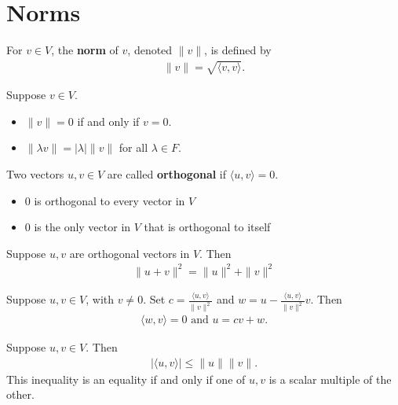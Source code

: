 \documentclass{memoir}
\begin{document}
\section{Norms}
\label{sec:norms}
\begin{defn}[Norm]
	For $v \in V$, the \textbf{norm} of $v$, denoted $\|v\|$, is defined by
	\begin{align*}
		 \|v\| = \sqrt{ \langle v, v \rangle } .
	\end{align*}
\end{defn}
\begin{cor}
	Suppose $v \in V$.
	\begin{itemize}
		\item $\|v\|=0$ if and only if $v = 0$.
		\item $\|\lambda v\|= \left| \lambda \right| \|v\|$ for all $\lambda \in F$.
	\end{itemize}
\end{cor}
\begin{defn}[Orthogonal]
	Two vectors $u,v \in V$ are called \textbf{orthogonal} if $ \langle u, v \rangle = 0$.
\end{defn}
\begin{cor}
	\begin{itemize}
		\item 0 is orthogonal to every vector in $V$ 
		\item 0 is the only vector in $V$ that is orthogonal to itself
	\end{itemize}
\end{cor}
\begin{thm}
	Suppose $u,v$ are orthogonal vectors in $V$. Then
	\begin{align*}
		\|u+v\|^2 = \|u\|^2+\|v\|^2
	\end{align*}
\end{thm}
\begin{cor}
	Suppose $u,v \in V$, with $v\neq 0$. Set $c = \frac{ \langle u, v \rangle }{\|v\|^2}$ and $w = u - \frac{ \langle u, v \rangle }{\|v\|^2}v$. Then
	\begin{align*}
 \langle w, v \rangle =0 \text{ and } u = cv + w.
	\end{align*}
\end{cor}
\begin{thm}
	Suppose $u,v \in V$. Then
	\begin{align*}
		 \left| \langle u, v \rangle  \right| \leq \|u\|\|v\|.
	\end{align*}
	This inequality is an equality if and only if one of $u,v$ is a scalar multiple of the other.
\end{thm}
\end{document}
